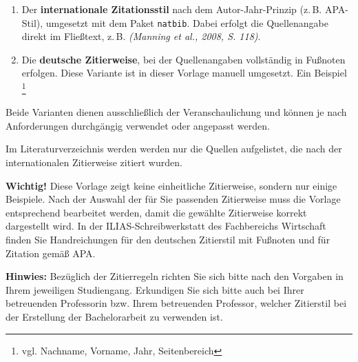 \begin{enumerate}
  \item Der \textbf{internationale Zitationsstil} nach dem Autor-Jahr-Prinzip (z.\,B. APA-Stil), umgesetzt mit dem Paket \texttt{natbib}. Dabei erfolgt die Quellenangabe direkt im Fließtext, z.\,B. \textit{(Manning et al., 2008, S. 118)}.
  
  \item Die \textbf{deutsche Zitierweise}, bei der Quellenangaben vollständig in Fußnoten erfolgen. Diese Variante ist in dieser Vorlage manuell umgesetzt. Ein Beispiel%
  \footnote{vgl. Nachname, Vorname, Jahr, Seitenbereich}
\end{enumerate}

Beide Varianten dienen ausschließlich der Veranschaulichung und können je nach Anforderungen durchgängig verwendet oder angepasst werden.

Im Literaturverzeichnis werden werden nur die Quellen aufgelistet, die nach der internationalen Zitierweise zitiert wurden.

\textbf{Wichtig!} Diese Vorlage zeigt keine einheitliche Zitierweise, sondern nur einige Beispiele. Nach der Auswahl der für Sie passenden Zitierweise muss die Vorlage entsprechend bearbeitet werden, damit die gewählte Zitierweise korrekt dargestellt wird. In der ILIAS-Schreibwerkstatt des Fachbereichs Wirtschaft finden Sie Handreichungen für den deutschen Zitierstil mit Fußnoten und für Zitation gemäß APA.

\textbf{Hinwies:} Bezüglich der Zitierregeln richten Sie sich bitte nach den Vorgaben in Ihrem jeweiligen Studiengang. Erkundigen Sie sich bitte auch bei Ihrer betreuenden Professorin bzw. Ihrem betreuenden Professor, welcher Zitierstil bei der Erstellung der Bachelorarbeit zu verwenden ist.
